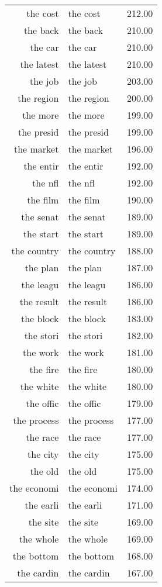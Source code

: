 \begin{table}[ht]
\begin{tabular}{rlr}
  the cost & the cost & 212.00 \\ 
  the back & the back & 210.00 \\ 
  the car & the car & 210.00 \\ 
  the latest & the latest & 210.00 \\ 
  the job & the job & 203.00 \\ 
  the region & the region & 200.00 \\ 
  the more & the more & 199.00 \\ 
  the presid & the presid & 199.00 \\ 
  the market & the market & 196.00 \\ 
  the entir & the entir & 192.00 \\ 
  the nfl & the nfl & 192.00 \\ 
  the film & the film & 190.00 \\ 
  the senat & the senat & 189.00 \\ 
  the start & the start & 189.00 \\ 
  the country & the country & 188.00 \\ 
  the plan & the plan & 187.00 \\ 
  the leagu & the leagu & 186.00 \\ 
  the result & the result & 186.00 \\ 
  the block & the block & 183.00 \\ 
  the stori & the stori & 182.00 \\ 
  the work & the work & 181.00 \\ 
  the fire & the fire & 180.00 \\ 
  the white & the white & 180.00 \\ 
  the offic & the offic & 179.00 \\ 
  the process & the process & 177.00 \\ 
  the race & the race & 177.00 \\ 
  the city & the city & 175.00 \\ 
  the old & the old & 175.00 \\ 
  the economi & the economi & 174.00 \\ 
  the earli & the earli & 171.00 \\ 
  the site & the site & 169.00 \\ 
  the whole & the whole & 169.00 \\ 
  the bottom & the bottom & 168.00 \\ 
  the cardin & the cardin & 167.00 \\ 

\end{tabular}
\end{table}

